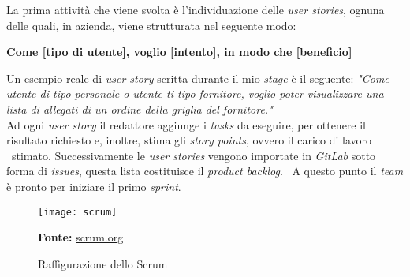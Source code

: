 La prima attività che viene svolta è l'individuazione delle \emph{user stories}, ognuna delle quali, in azienda, viene strutturata nel seguente modo:
\begin{center}
  \textbf{Come [tipo di utente], voglio [intento], in modo che [beneficio]}
\end{center}

Un esempio reale di \emph{user story} scritta durante il mio \emph{stage} è il seguente: 
\newline
\emph{"Come utente di tipo personale o utente ti tipo fornitore, voglio poter visualizzare una lista di allegati di un ordine della griglia del fornitore."} \\

Ad ogni \emph{user story} il redattore aggiunge i \emph{tasks} da eseguire, per ottenere il risultato richiesto e, inoltre, stima gli \emph{story points}, ovvero il carico di lavoro \
stimato. Successivamente le \emph{user stories} vengono importate in \emph{GitLab} sotto forma di \emph{issues}, questa lista costituisce il \emph{product backlog}. \
A questo punto il \emph{team} è pronto per iniziare il primo \emph{sprint}. \\

\begin{figure}[!ht]
  \begin{center}
    \texttt{[image: scrum]}
    \caption{Raffigurazione dello Scrum}
    \textbf{Fonte:} \href{https://www.scrum.org}{scrum.org}
    \label{fig:scrum}
  \end{center}
\end{figure}

